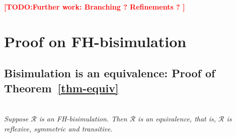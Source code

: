 \documentclass{lmcs}
\newcommand{\TODO}[1]{\textcolor{red}{\textbf{[TODO:#1]}}}
\begin{document}
\TODO{Further work: Branching ? Refinements ? }





% 


\newpage
\appendix    
\section{Proof on FH-bisimulation}
\subsection{Bisimulation is an equivalence: Proof of Theorem~\ref{thm-equiv}}\label{thm-equiv-proof}~\\
        \emph{Suppose $\mathcal{R}$ 
       	is an FH-bisimulation. Then $\mathcal{R}$ is an equivalence, that is, 
       	$\mathcal{R}$ is 
       	reflexive, symmetric and transitive.
       	}
       
\end{document}
